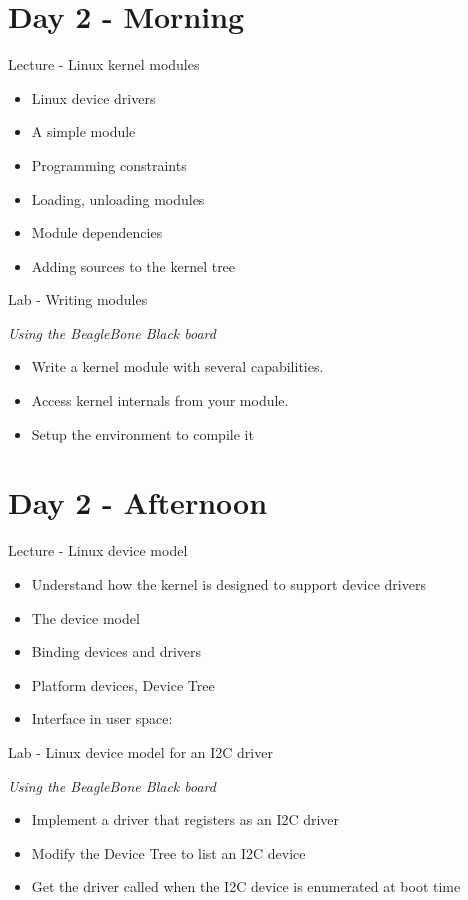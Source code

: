 \documentclass[a4paper,12pt,obeyspaces,spaces,hyphens]{article}
\begin{document}
\section{Day 2 - Morning}

\feagendatwocolumn
{Lecture - Linux kernel modules}
{
  \begin{itemize}
  \item Linux device drivers
  \item A simple module
  \item Programming constraints
  \item Loading, unloading modules
  \item Module dependencies
  \item Adding sources to the kernel tree
  \end{itemize}
}
{Lab - Writing modules}
{
  {\em Using the BeagleBone Black board}
  \begin{itemize}
  \item Write a kernel module with several capabilities.
  \item Access kernel internals from your module.
  \item Setup the environment to compile it
  \end{itemize}
}

\section{Day 2 - Afternoon}

\feagendatwocolumn
{Lecture - Linux device model}
{
  \begin{itemize}
  \item Understand how the kernel is designed to support device
    drivers
  \item The device model
  \item Binding devices and drivers
  \item Platform devices, Device Tree
  \item Interface in user space: 
  \end{itemize}
}
{Lab - Linux device model for an I2C driver}
{
  {\em Using the BeagleBone Black board}
  \begin{itemize}
  \item Implement a driver that registers as an I2C driver
  \item Modify the Device Tree to list an I2C device
  \item Get the driver called when the I2C device is enumerated at
    boot time
  \end{itemize}
}
\end{document}

